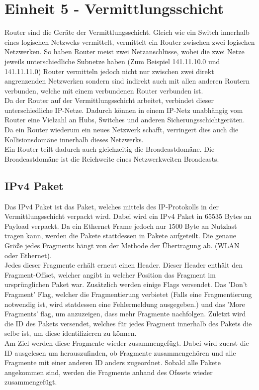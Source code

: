 \documentclass{article}
\begin{document}
	 \section{Einheit 5 - Vermittlungsschicht}
	 Router sind die Geräte der Vermittlungsschicht. Gleich wie ein Switch innerhalb eines logischen Netzweks vermittelt, vermittelt ein Router zwischen zwei logischen Netzwerken. So haben Router meist zwei Netzanschlüsse, wobei die zwei Netze jeweils unterschiedliche Subnetze haben (Zum Beispiel 141.11.10.0 und 141.11.11.0) Router vermitteln jedoch nicht nur zwischen zwei direkt angrenzenden Netzwerken sondern sind indirekt auch mit allen anderen Routern verbunden, welche mit einem verbundenen Router verbunden ist. \\
	 Da der Router auf der Vermittlungsschicht arbeitet, verbindet dieser unterschiedliche IP-Netze. Dadurch können in einem IP-Netz unabhängig vom Router eine Vielzahl an Hubs, Switches und anderen Sicherungsschichtgeräten. Da ein Router wiederum ein neues Netzwerk schafft, verringert dies auch die Kollisionsdomäne innerhalb dieses Netzwerks. \\
	 Ein Router teilt dadurch auch gleichzeitig die Broadcastdomäne. Die Broadcastdomäne ist die Reichweite eines Netzwerkweiten Broadcasts. \\
	 \subsection{IPv4 Paket}
	 Das IPv4 Paket ist das Paket, welches mittels des IP-Protokolls in der Vermittlungsschicht verpackt wird. Dabei wird ein IPv4 Paket in 65535 Bytes an Payload verpackt. Da ein Ethernet Frame jedoch nur 1500 Byte an Nutzlast tragen kann, werden die Pakete stattdessen in Pakete aufgeteilt. Die genaue Größe jedes Fragments hängt von der Methode der Übertragung ab. (WLAN oder Ethernet). \\
	 Jedes dieser Fragmente erhält erneut einen Header. Dieser Header enthält den Fragment-Offset, welcher angibt in welcher Position das Fragment im ursprünglichen Paket war. Zusätzlich werden einige Flags versendet. Das 'Don't Fragment' Flag, welcher die Fragmentierung verbietet (Falls eine Fragmentierung notwendig ist, wird statdessen eine Fehlermeldung ausgegeben.) und das 'More Fragments' flag, um anzuzeigen, dass mehr Fragmente nachfolgen. Zuletzt wird die ID des Pakets versendet, welches für jedes Fragment innerhalb des Pakets die selbe ist, um diese identifizieren zu können. \\
	 Am Ziel werden diese Fragmente wieder zusammengefügt. Dabei wird zuerst die ID ausgelesen um herauszufinden, ob Fragmente zusammengehören und alle Fragmente mit einer anderen ID anders zugeordnet. Sobald alle Pakete angekommen sind, werden die Fragmente anhand des Ofssets wieder zusammengefügt.
\end{document}
